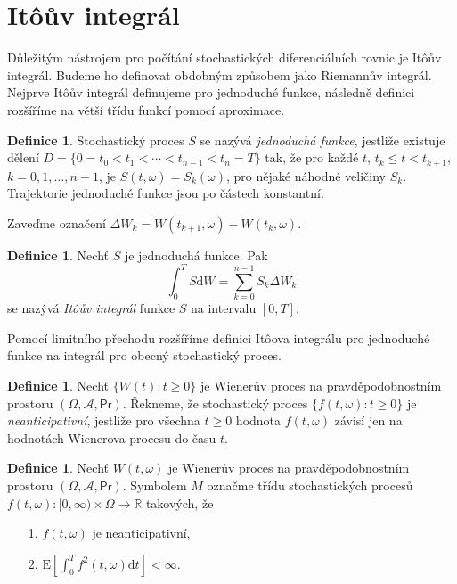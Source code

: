 \documentclass[a4paper,12pt]{report}
\theoremstyle{definition} \newtheorem{definice}[veta]{Definice}
\theoremstyle{remark}
\begin{document}
\section{It\^oův integrál}
Důležitým nástrojem pro počítání stochastických diferenciálních rovnic je It\^oův integrál.
Budeme ho definovat obdobným způsobem jako Riemannův integrál.
Nejprve It\^oův integrál definujeme pro jednoduché funkce, následně definici rozšíříme na větší třídu funkcí pomocí aproximace.
\newline
\begin{definice}
Stochastický proces $S$ se nazývá \textit{jednoduchá funkce}, jestliže existuje dělení $D=\{0=t_0<t_1<\cdots<t_{n-1}<t_n=T\}$ tak, že pro každé $t$, $t_k\le t<t_{k+1}$, $k=0,1,\dots,n-1$, je $S(t,\omega)=S_k(\omega)$, pro nějaké náhodné veličiny $S_k$. \newline\newline
Trajektorie jednoduché funkce jsou po částech konstantní. 
\end{definice}


Zaveďme označení $\Delta W_k=W(t_{k+1},\omega)-W(t_k,\omega)$.
\\
\begin{definice}
Nechť $S$ je jednoduchá funkce. Pak
$$\int_0^TS\mathrm{d}W=\sum_{k=0}^{n-1}S_k\Delta W_k$$
se nazývá \textit{It\^oův integrál} funkce $S$ na intervalu $[0,T]$.
\\
\end{definice}

Pomocí limitního přechodu rozšíříme definici It\^oova integrálu pro jednoduché funkce na integrál pro obecný stochastický proces.
\begin{definice}
Nechť $\{W(t):t\ge0\}$ je Wienerův proces na pravděpodobnostním prostoru $(\Omega,\mathcal{A},\mathsf{Pr})$.
Řekneme, že stochastický proces $\{f(t,\omega):t\ge0\}$ je \textit{neanticipativní}, jestliže pro všechna $t\ge0$ hodnota $f(t,\omega)$ závisí jen na hodnotách Wienerova procesu do času $t$.
\\
\end{definice}

\begin{definice}
Nechť $W(t,\omega)$ je Wienerův proces na pravděpodobnostním prostoru $(\Omega,\mathcal{A},\mathsf{Pr})$.
Symbolem $M$ označme třídu stochastických procesů $f(t,\omega):[0,\infty)\times\Omega\to\mathbb R$ takových, že
\begin{enumerate}
\item[1.] $f(t,\omega)$ je neanticipativní, 
\item[2.] $\text{E}\left[\int_0^Tf^2(t,\omega)\mathrm{d}t\right]<\infty.$ 
\\
\end{enumerate}
\end{definice}
\end{document}
